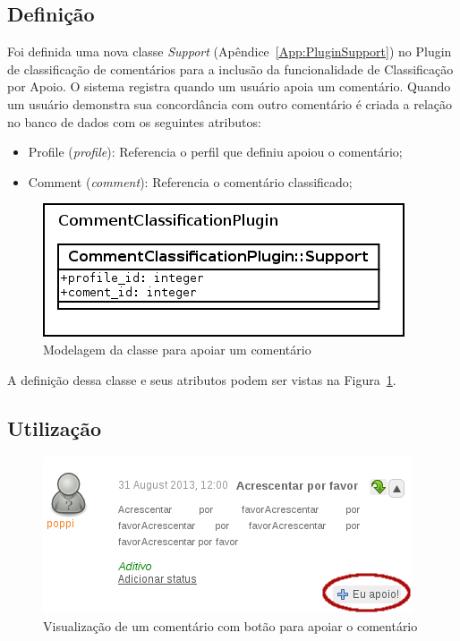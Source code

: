 \documentclass[11pt]{article}
\begin{document}
\subsection{Definição}

Foi definida uma nova classe {\it Support}
(Apêndice~\ref{App:PluginSupport}) no Plugin de classificação de
comentários para a inclusão da funcionalidade de Classificação por
Apoio. O sistema registra quando um usuário apoia um comentário. Quando
um usuário demonstra sua concordância com outro comentário é criada a
relação no banco de dados com os seguintes atributos:
\begin{itemize}
  \item Profile ({\it profile}): Referencia o perfil que definiu apoiou
o comentário;
  \item Comment ({\it comment}): Referencia o comentário classificado;
\end{itemize}

\begin{figure}[h]
\center
\includegraphics[scale=0.5]{support-model.png}
\caption{Modelagem da classe para apoiar um comentário}
\label{fig:support-model}
\end{figure}

A definição dessa classe e seus atributos podem ser vistas na
Figura~\ref{fig:support-model}.

\subsection{Utilização}

\begin{figure}[h]
\center
\includegraphics[scale=0.6]{comment-view-support.png}
\caption{Visualização de um comentário com botão para apoiar o
comentário}
\label{fig:comment-view-support}
\end{figure}
\end{document}
